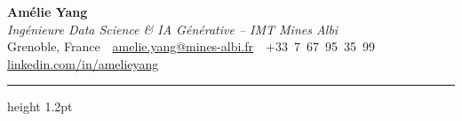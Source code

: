 \documentclass[10.5pt,a4paper]{article}
\begin{document}
\begin{center}
  {\fontsize{26}{30}\selectfont\bfseries Amélie Yang}\\[4pt]
  {\color{accent}\itshape\large Ingénieure Data Science \& IA Générative -- IMT Mines Albi}\\[6pt]
  {\small
    Grenoble, France
    \,\textbullet\,
    \href{mailto:amelie.yang@mines-albi.fr}{amelie.yang@mines-albi.fr}
    \,\textbullet\,
    +33~7~67~95~35~99
    \,\textbullet\,
    \href{https://www.linkedin.com/in/amelieyang}{linkedin.com/in/amelieyang}
  }
\end{center}

\vspace{3pt}
{\color{accent}\hrule height 1.2pt}
\vspace{4pt}
\end{document}

